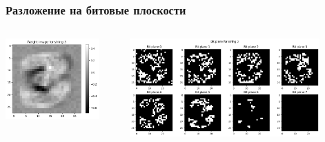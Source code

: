 \begin{frame}[t]
\frametitle{Разложение на битовые плоскости}
\begin{columns}
    \hspace{5mm}
    \centering 
    \begin{block}{}
        \vspace{3mm}
        \includegraphics[width = 0.85\textwidth]{pics/output1.png} 
    \end{block}
     
    \centering 
    \begin{block}{}
        \vspace{3mm}
        \includegraphics[width = 0.85\textwidth]{pics/output.png} 
    \end{block}
\end{columns}
\end{frame}

